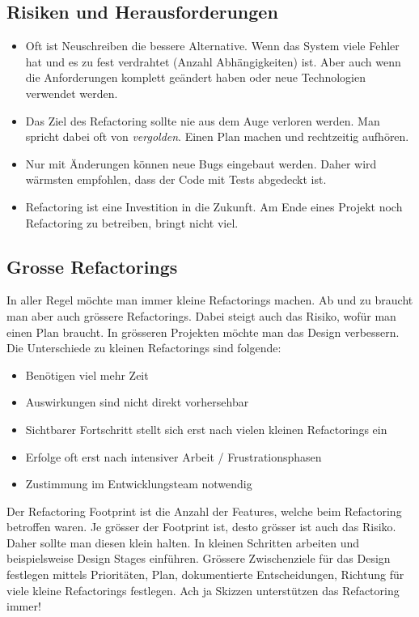 \subsection{Risiken und Herausforderungen}
\begin{itemize}
	\item Oft ist Neuschreiben die bessere Alternative. Wenn das System viele Fehler hat und es zu fest verdrahtet (Anzahl Abhängigkeiten) ist. Aber auch wenn die Anforderungen komplett geändert haben oder neue Technologien verwendet werden. 
	
	\item Das Ziel des Refactoring sollte nie aus dem Auge verloren werden. Man spricht dabei oft von \textit{vergolden}. Einen Plan machen und rechtzeitig aufhören.
	
	\item Nur mit Änderungen können neue Bugs eingebaut werden. Daher wird wärmsten empfohlen, dass der Code mit Tests abgedeckt ist.
	
	\item Refactoring ist eine Investition in die Zukunft. Am Ende eines Projekt noch Refactoring zu betreiben, bringt nicht viel.
\end{itemize}

\subsection{Grosse Refactorings}
In aller Regel möchte man immer kleine Refactorings machen. Ab und zu braucht man aber auch grössere Refactorings. Dabei steigt auch das Risiko, wofür man einen Plan braucht. In grösseren Projekten möchte man das Design verbessern. Die Unterschiede zu kleinen Refactorings sind folgende:

\begin{itemize}
	\item Benötigen viel mehr Zeit
	\item Auswirkungen sind nicht direkt vorhersehbar
	\item Sichtbarer Fortschritt stellt sich erst nach vielen kleinen Refactorings ein
	\item Erfolge oft erst nach intensiver Arbeit / Frustrationsphasen
	\item Zustimmung im Entwicklungsteam notwendig
\end{itemize}

Der Refactoring Footprint ist die Anzahl der Features, welche beim Refactoring betroffen waren. Je grösser der Footprint ist, desto grösser ist auch das Risiko. Daher sollte man diesen klein halten. In kleinen Schritten arbeiten und beispielsweise Design Stages einführen. Grössere Zwischenziele für das Design festlegen mittels Prioritäten, Plan, dokumentierte Entscheidungen, Richtung für viele kleine Refactorings festlegen. Ach ja Skizzen unterstützen das Refactoring immer! 

